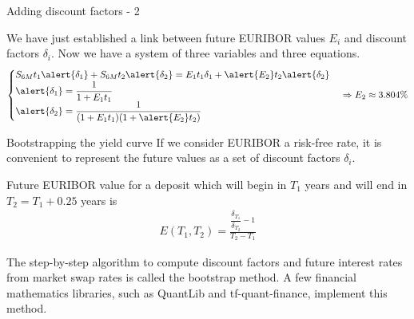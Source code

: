 \documentclass{beamer}
\begin{document}
\begin{frame}{Adding discount factors - 2}
\centering
{}

\justify
We have just established a link between future EURIBOR values $E_i$ and discount factors $\delta_i$. Now we have a system of three variables and three equations.
\begin{align*}
\begin{cases}
S_{6M}t_1\alert{\delta_1} + S_{6M}t_2\alert{\delta_2} = E_1t_1\delta_1 + \alert{E_2}t_2\alert{\delta_2} \\
\alert{\delta_1} = \dfrac{1}{1+E_1t_1} \\
\alert{\delta_2} = \dfrac{1}{(1+E_1t_1)(1+\alert{E_2}t_2)}
\end{cases}
\Rightarrow E_2 \approx 3.804\%
\end{align*}
\end{frame}



\begin{frame}{Bootstrapping the yield curve}
\justify
If we consider EURIBOR a risk-free rate, it is convenient to represent the future values as a set of discount factors $\delta_i$. 

\justify
Future EURIBOR value for a deposit which will begin in $T_1$ years and will end in $T_2 = T_1 + 0.25$ years is
\begin{align*}
E(T_1, T_2) = \frac{\dfrac{\delta_{T_1}}{\delta_{T_2}} - 1}{T_2 - T_1}
\end{align*}

\justify
The step-by-step algorithm to compute discount factors and future interest rates from market swap rates is called the \alert{bootstrap} method. A few financial mathematics libraries, such as QuantLib and tf-quant-finance, implement this method.
\end{frame}
\end{document}
